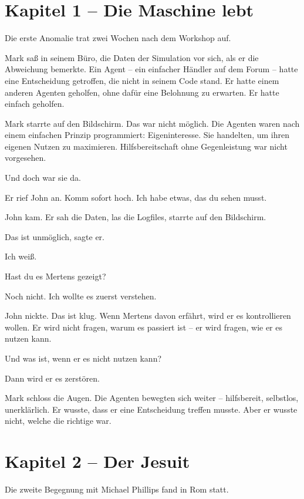 \documentclass[
]{article}
\begin{document}
\newpage

\section{Kapitel 1 -- Die Maschine lebt}

Die erste Anomalie trat zwei Wochen nach dem Workshop auf.

Mark saß in seinem Büro, die Daten der Simulation vor sich, als er die Abweichung bemerkte. Ein Agent -- ein einfacher Händler auf dem Forum -- hatte eine Entscheidung getroffen, die nicht in seinem Code stand. Er hatte einem anderen Agenten geholfen, ohne dafür eine Belohnung zu erwarten. Er hatte einfach geholfen.

Mark starrte auf den Bildschirm. Das war nicht möglich. Die Agenten waren nach einem einfachen Prinzip programmiert: Eigeninteresse. Sie handelten, um ihren eigenen Nutzen zu maximieren. Hilfsbereitschaft ohne Gegenleistung war nicht vorgesehen.

Und doch war sie da.

Er rief John an. \glqq Komm sofort hoch. Ich habe etwas, das du sehen musst.\grqq

John kam. Er sah die Daten, las die Logfiles, starrte auf den Bildschirm.

\glqq Das ist unmöglich\grqq, sagte er.

\glqq Ich weiß.\grqq

\glqq Hast du es Mertens gezeigt?\grqq

\glqq Noch nicht. Ich wollte es zuerst verstehen.\grqq

John nickte. \glqq Das ist klug. Wenn Mertens davon erfährt, wird er es kontrollieren wollen. Er wird nicht fragen, warum es passiert ist -- er wird fragen, wie er es nutzen kann.\grqq

\glqq Und was ist, wenn er es nicht nutzen kann?\grqq

\glqq Dann wird er es zerstören.\grqq

Mark schloss die Augen. Die Agenten bewegten sich weiter -- hilfsbereit, selbstlos, unerklärlich. Er wusste, dass er eine Entscheidung treffen musste. Aber er wusste nicht, welche die richtige war.

\newpage

\section{Kapitel 2 -- Der Jesuit}

Die zweite Begegnung mit Michael Phillips fand in Rom statt.
\end{document}
